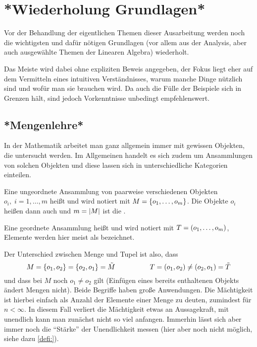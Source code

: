 \documentclass[../H_Analysis_main.tex]{subfiles}
\begin{document}
\chapter{*Wiederholung Grundlagen*}

\begin{center}
Vor der Behandlung der eigentlichen Themen dieser Ausarbeitung werden noch die wichtigsten und dafür nötigen Grundlagen (vor allem aus der Analysis, aber auch ausgewählte Themen der Linearen Algebra) wiederholt.

Das Meiste wird dabei ohne expliziten Beweis angegeben, der Fokus liegt eher auf dem Vermitteln eines intuitiven Verständnisses, warum manche Dinge nützlich sind und wofür man sie brauchen wird. Da auch die Fülle der Beispiele sich in Grenzen hält, sind jedoch Vorkenntnisse unbedingt empfehlenswert.
\end{center}


\newpage


	\section{*Mengenlehre*}
In der Mathematik arbeitet man ganz allgemein immer mit gewissen Objekten, die untersucht werden. Im Allgemeinen handelt es sich zudem um Ansammlungen von solchen Objekten und diese lassen sich in unterschiedliche Kategorien einteilen.

\begin{defi}
Eine ungeordnete Ansammlung von paarweise verschiedenen Objekten $o_i, \; i = 1, \dots, m$ heißt  und wird notiert mit $M = \qty{o_1, \dots, o_m}$. Die Objekte $o_i$ heißen dann auch  und $m = \abs{M}$ ist die .

Eine geordnete Ansammlung heißt  und wird notiert mit $T = \qty(o_1, \dots, o_m)$, Elemente werden hier meist als  bezeichnet.
\end{defi}

Der Unterschied zwischen Menge und Tupel ist also, dass
\begin{equation*}
M = \qty{o_1, o_2} = \qty{o_2, o_1} = \tilde{M} \qquad \quad \qquad T = \qty(o_1, o_2) \neq \qty(o_2, o_1) = \tilde{T}
\end{equation*}
und dass bei $M$ noch $o_1 \neq o_2$ gilt (Einfügen eines bereits enthaltenen Objekts ändert Mengen nicht). Beide Begriffe haben große Anwendungen. Die Mächtigkeit ist hierbei einfach als Anzahl der Elemente einer Menge zu deuten, zumindest für $n < \infty$. In diesem Fall verliert die Mächtigkeit etwas an Aussagekraft, mit unendlich kann man zunächst nicht so viel anfangen. Immerhin lässt sich aber immer noch die \enquote{Stärke} der Unendlichkeit messen (hier aber noch nicht möglich, siehe dazu \ref{defi:}).
\end{document}
